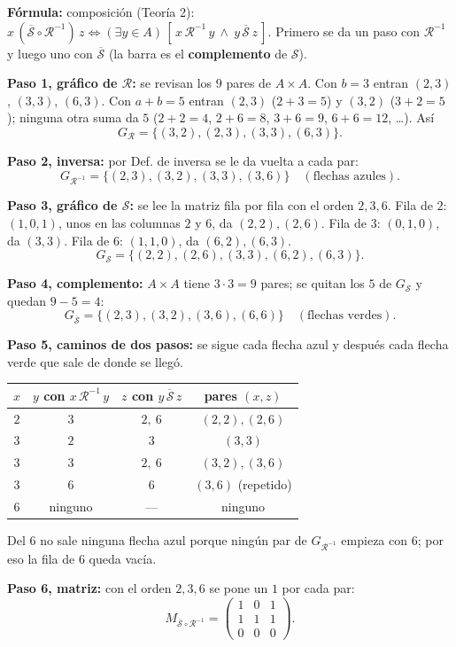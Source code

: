 \documentclass[11pt]{article}
\newcommand{\R}{\mathcal R}
\newcommand{\Sc}{\mathcal S}
\newcommand{\Sb}{\overline{\mathcal S}}
\begin{document}
\begin{explica}
\textbf{Fórmula:} composición (Teoría 2): $x\,(\Sb\circ\R^{-1})\,z\iff(\exists y\in A)\,[\,x\,\R^{-1}\,y\ \wedge\ y\,\Sb\,z\,]$. Primero se da un paso con $\R^{-1}$ y luego uno con $\Sb$ (la barra es el \textbf{complemento} de $\Sc$).

\textbf{Paso 1, gráfico de $\R$:} se revisan los $9$ pares de $A\times A$. Con $b=3$ entran $(2,3)$, $(3,3)$, $(6,3)$. Con $a+b=5$ entran $(2,3)$ ($2+3=5$) y $(3,2)$ ($3+2=5$); ninguna otra suma da $5$ ($2+2=4$, $2+6=8$, $3+6=9$, $6+6=12$, \dots). Así
\[G_\R=\{(3,2),(2,3),(3,3),(6,3)\}.\]

\textbf{Paso 2, inversa:} por Def. de inversa se le da vuelta a cada par:
\[G_{\R^{-1}}=\{(2,3),(3,2),(3,3),(3,6)\}\quad(\text{flechas azules}).\]

\textbf{Paso 3, gráfico de $\Sc$:} se lee la matriz fila por fila con el orden $2,3,6$. Fila de $2$: $(1,0,1)$, unos en las columnas $2$ y $6$, da $(2,2),(2,6)$. Fila de $3$: $(0,1,0)$, da $(3,3)$. Fila de $6$: $(1,1,0)$, da $(6,2),(6,3)$.
\[G_\Sc=\{(2,2),(2,6),(3,3),(6,2),(6,3)\}.\]

\textbf{Paso 4, complemento:} $A\times A$ tiene $3\cdot3=9$ pares; se quitan los $5$ de $G_\Sc$ y quedan $9-5=4$:
\[G_{\Sb}=\{(2,3),(3,2),(3,6),(6,6)\}\quad(\text{flechas verdes}).\]

\textbf{Paso 5, caminos de dos pasos:} se sigue cada flecha azul y después cada flecha verde que sale de donde se llegó.
\begin{center}
\renewcommand{\arraystretch}{1.25}
\begin{tabular}{|c|c|c|c|}\hline
$x$ & $y$ con $x\,\R^{-1}\,y$ & $z$ con $y\,\Sb\,z$ & pares $(x,z)$\\\hline
$2$ & $3$ & $2,\ 6$ & $(2,2),(2,6)$\\
$3$ & $2$ & $3$ & $(3,3)$\\
$3$ & $3$ & $2,\ 6$ & $(3,2),(3,6)$\\
$3$ & $6$ & $6$ & $(3,6)$ (repetido)\\
$6$ & ninguno & --- & ninguno\\\hline
\end{tabular}
\end{center}
Del $6$ no sale ninguna flecha azul porque ningún par de $G_{\R^{-1}}$ empieza con $6$; por eso la fila de $6$ queda vacía.

\textbf{Paso 6, matriz:} con el orden $2,3,6$ se pone un $1$ por cada par:
\[M_{\Sb\circ\R^{-1}}=\begin{pmatrix}1&0&1\\1&1&1\\0&0&0\end{pmatrix}.\]
\end{explica}
\end{document}

